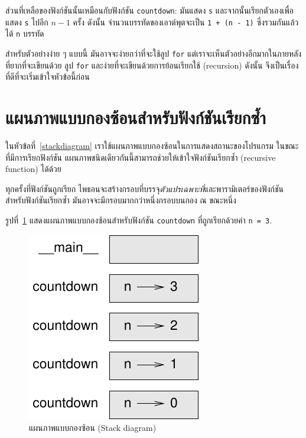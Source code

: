 ส่วนที่เหลือของฟังก์ชันนั้นเหมือนกับฟังก์ชัน {\tt countdown}: มันแสดง {\tt s} และจากนั้นเรียกตัวเองเพื่อแสดง {\tt s} ไปอีก {\scriptsize$n-1$} ครั้ง
ดังนั้น จำนวนบรรทัดของเอาต์พุตจะเป็น {\tt 1 + (n - 1)} ซึ่งรวมกันแล้วได้ {\tt n} บรรทัด

สำหรับตัวอย่างง่าย ๆ แบบนี้ มันอาจจะง่ายกว่าที่จะใช้ลูป {\tt for} แต่เราจะเห็นตัวอย่างอีกมากในภายหลังที่ยากที่จะเขียนด้วย ลูป {\tt for}
และง่ายที่จะเขียนด้วยการย้อนเรียกใช้ (recursion)  ดังนั้น จึงเป็นเรื่องที่ดีที่จะเริ่มเข้าใจหัวข้อนี้ก่อน


\section{แผนภาพแบบกองซ้อนสำหรับฟังก์ชันเรียกซ้ำ}%
\label{recursive.stack}

ในหัวข้อที่~\ref{stackdiagram} เราใช้แผนภาพแบบกองซ้อนในการแสดงสถานะของโปรแกรม
ในขณะที่มีการเรียกฟังก์ชัน แผนภาพชนิดเดียวกันนี้สามารถช่วยให้เข้าใจฟังก์ชันเรียกซ้ำ (recursive function) ได้ด้วย

ทุกครั้งที่ฟังก์ชันถูกเรียก ไพธอนจะสร้างกรอบที่บรรจุ\textit{ตัวแปรเฉพาะที่}และพารามิเตอร์ของฟังก์ชัน
สำหรับฟังก์ชันเรียกซ้ำ มันอาจจะมีกรอบมากกว่าหนึ่งกรอบบนกอง ณ ขณะหนึ่ง

รูปที่~\ref{fig.stack2} แสดงแผนภาพแบบกองซ้อนสำหรับฟังก์ชัน {\tt countdown} ที่ถูกเรียกด้วยค่า {\tt n = 3}.

\begin{figure}
\centerline
{\includegraphics[scale=0.8]{figs/stack2.pdf}}
\caption{แผนภาพแบบกองซ้อน (Stack diagram)}
\label{fig.stack2}
\end{figure}


